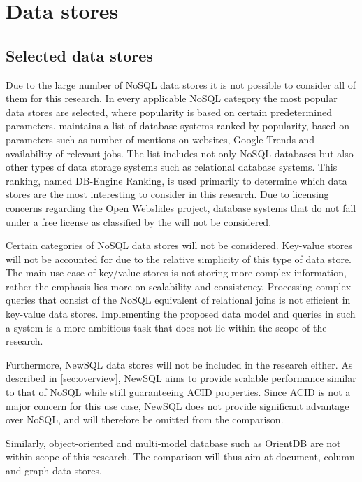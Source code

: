 \chapter{Data stores}
\label{ch:data-stores}

\section{Selected data stores}
\label{sec:selected-data-stores}

Due to the large number of NoSQL data stores it is not possible to consider all of them for this research. In every applicable NoSQL category the most popular data stores are selected, where popularity is based on certain predetermined parameters. \textcite{DBEngine2018} maintains a list of database systems ranked by popularity, based on parameters such as number of mentions on websites, Google Trends and availability of relevant jobs. The list includes not only NoSQL databases but also other types of data storage systems such as relational database systems. This ranking, named DB-Engine Ranking, is used primarily to determine which data stores are the most interesting to consider in this research. Due to licensing concerns regarding the Open Webslides project, database systems that do not fall under a free license as classified by the \textcite{FreeSoftwareFoundation1985} will not be considered.

Certain categories of NoSQL data stores will not be considered. Key-value stores will not be accounted for due to the relative simplicity of this type of data store. The main use case of key/value stores is not storing more complex information, rather the emphasis lies more on scalability and consistency. Processing complex queries that consist of the NoSQL equivalent of relational joins is not efficient in key-value data stores. Implementing the proposed data model and queries in such a system is a more ambitious task that does not lie within the scope of the research.

Furthermore, NewSQL data stores will not be included in the research either. As described in \cref{sec:overview}, NewSQL aims to provide scalable performance similar to that of NoSQL while still guaranteeing ACID properties. Since ACID is not a major concern for this use case, NewSQL does not provide significant advantage over NoSQL, and will therefore be omitted from the comparison.

Similarly, object-oriented and multi-model database such as OrientDB \autocite{OrientDB2010} are not within scope of this research. The comparison will thus aim at document, column and graph data stores.

